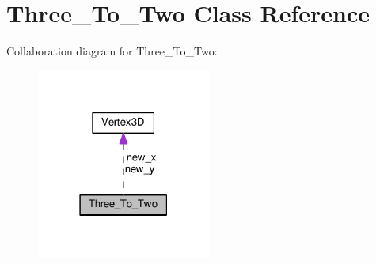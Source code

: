 \hypertarget{class_three___to___two}{}\section{Three\+\_\+\+To\+\_\+\+Two Class Reference}
\label{class_three___to___two}


Collaboration diagram for Three\+\_\+\+To\+\_\+\+Two\+:
\nopagebreak
\begin{figure}[H]
\begin{center}
\leavevmode
\includegraphics[width=162pt]{class_three___to___two__coll__graph}
\end{center}
\end{figure}
